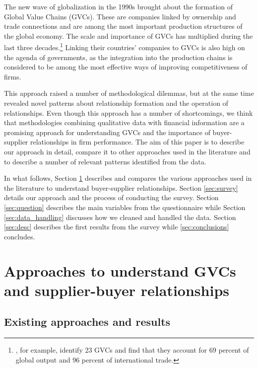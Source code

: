 \documentclass[final, dvipsnames, authoryear,12pt]{elsarticle}
\begin{document}
The new wave of globalization in the 1990s brought about the formation of Global Value Chains (GVCs). These are companies linked by ownership and trade connections and are among the most important production structures of the global economy. The scale and importance of GVCs has multiplied during the last three decades.\footnote{\cite{mckinsey2019gvc}, for example, identify 23 GVCs and find that they account for 69 percent of global output and 96 percent of international trade.} Linking their countries' companies to GVCs is also high on the agenda of governments, as the integration into the production chains is considered to be among the most effective ways of improving competitiveness of firms.





This approach raised a number of methodological dilemmas, but at the same time revealed novel patterns about relationship formation and the operation of relationships. Even though this approach has a number of shortcomings, we think that methodologies combining qualitative data with financial information are a promising approach for understanding GVCs and the importance of buyer-supplier relationships in firm performance. The aim of this paper is to describe our approach in detail, compare it to other approaches used in the literature and to describe a number of relevant patterns identified from the data. 

In what follows, Section \ref{sec: approach} describes and compares the various approaches used in the literature to understand buyer-supplier relationships. Section \ref{sec:survey} details our approach and the process of conducting the survey. Section \ref{sec:question} describes the main variables from the questionnaire while Section \ref{sec:data_handling} discusses how we cleaned and handled the data. Section \ref{sec:desc} describes the first results from the survey while \ref{sec:conclusions} concludes.  

\section{Approaches to understand GVCs and supplier-buyer relationships} 
\label{sec: approach}

\subsection{Existing approaches and results}
\end{document}
